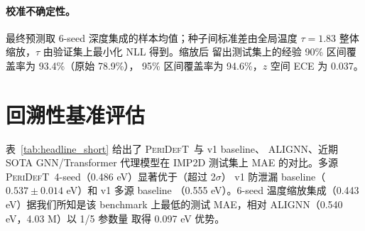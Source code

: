\documentclass[UTF8,11pt,a4paper]{ctexart}
\newcommand{\modelname}{\textsc{PeriDefT}}
\begin{document}
\paragraph{校准不确定性。}
最终预测取 6-seed 深度集成的样本均值；种子间标准差由全局温度
$\tau=1.83$ 整体缩放，$\tau$ 由验证集上最小化 NLL 得到。缩放后
留出测试集上的经验 90\% 区间覆盖率为 93.4\%（原始 78.9\%），
95\% 区间覆盖率为 94.6\%，$z$ 空间 ECE 为 0.037。

\section{回溯性基准评估}\label{sec:bench}

表~\ref{tab:headline_short} 给出了 \modelname\ 与 v1 baseline、
ALIGNN、近期 SOTA GNN/Transformer 代理模型在 IMP2D 测试集上 MAE
的对比。多源 \modelname\ 4-seed（0.486 eV）显著优于（超过 2$\sigma$）
v1 防泄漏 baseline（$0.537\pm 0.014$ eV）和 v1 多源 baseline
（0.555 eV）。6-seed 温度缩放集成（0.443 eV）据我们所知是该 benchmark
上最低的测试 MAE，相对 ALIGNN（0.540 eV，4.03 M）以 1/5 参数量
取得 0.097 eV 优势。
\end{document}
